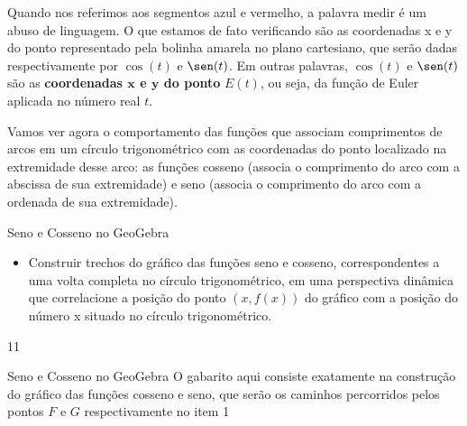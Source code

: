 Quando nos referimos aos segmentos azul e vermelho, a palavra medir é um abuso de linguagem. O que estamos de fato verificando são as coordenadas x e y do ponto representado pela bolinha amarela no plano cartesiano, que serão dadas respectivamente por $\cos(t)$ e $\sen(t)$.  Em outras palavras, $\cos(t)$ e $\sen(t)$ são as \textbf{coordenadas $\bm{x}$ e $\bm{y}$ do ponto} $E(t)$, ou seja, da função de Euler aplicada no número real $t$.

Vamos ver agora o comportamento das funções que associam comprimentos de arcos em um círculo trigonométrico com as coordenadas do ponto localizado na extremidade desse arco: as funções cosseno (associa o comprimento do arco com a abscissa de sua extremidade) e seno (associa o comprimento do arco com a ordenada de sua extremidade).
\clearpage

\def\currentcolor{session1}
\begin{objectives}{Seno e Cosseno no GeoGebra}
{
\begin{itemize}
\item Construir trechos do gráfico das funções seno e cosseno, correspondentes a uma volta completa no círculo trigonométrico, em uma perspectiva dinâmica que correlacione a posição do ponto $(x,f(x))$ do gráfico com a posição do número x situado no círculo trigonométrico.
\end{itemize}
}{1}{1}
\end{objectives}
\begin{answer}{Seno e Cosseno no GeoGebra}
{
O gabarito aqui consiste exatamente na construção do gráfico das funções cosseno e seno, que serão os caminhos percorridos pelos pontos $F$ e $G$ respectivamente no item 
}{1}
\end{answer}

\label{trig-exp5}

